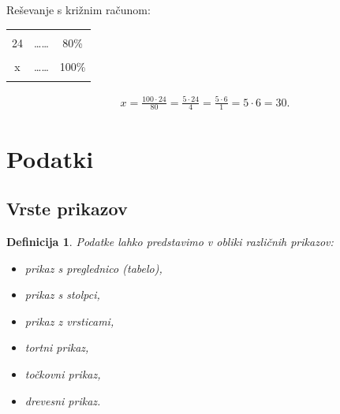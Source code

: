 \documentclass{article}
\newtheorem{definicija}{Definicija}[subsection]
\begin{document}
Reševanje s križnim računom:
\begin{center}
    \begin{tabular}{ c c c  }
        && \\
        24 & \dots\dots & 80\% \\ 
        && \\
        x & \dots\dots & 100\% \\ 
        && \\
    \end{tabular}
\end{center}

\begin{align*}
    x = \frac{100 \cdot 24}{80} = \frac{5 \cdot 24}{4} = \frac{5 \cdot 6}{1} = 5 \cdot 6 = 30.
\end{align*}


\pagebreak
\section{Podatki}
\subsection{Vrste prikazov}

\begin{definicija}
    Podatke lahko predstavimo v obliki različnih prikazov:
    \begin{itemize}
        \item prikaz s preglednico (tabelo),
        \item prikaz s stolpci,
        \item prikaz z vrsticami,
        \item tortni prikaz,
        \item točkovni prikaz,
        \item drevesni prikaz.
    \end{itemize}
\end{definicija}
\end{document}
